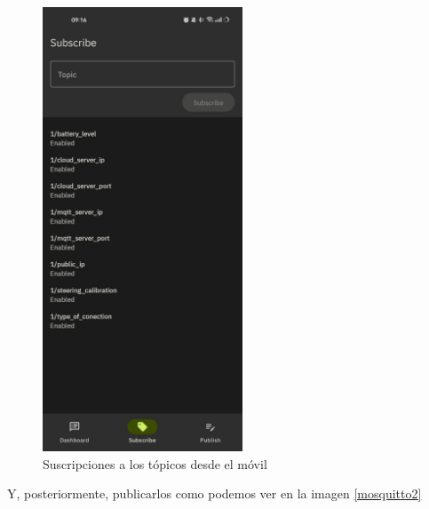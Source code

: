 \begin{enumerate}
 \begin{figure}[H]
    \centering
    \includegraphics[width=0.53\textwidth]{Imagenes/Rendimiento/mosquitto1.jpeg}
    \caption{Suscripciones a los tópicos desde el móvil}
    \label{mosquitto1}
\end{figure}

Y, posteriormente, publicarlos como podemos ver en la imagen \ref{mosquitto2}


\end{enumerate}
